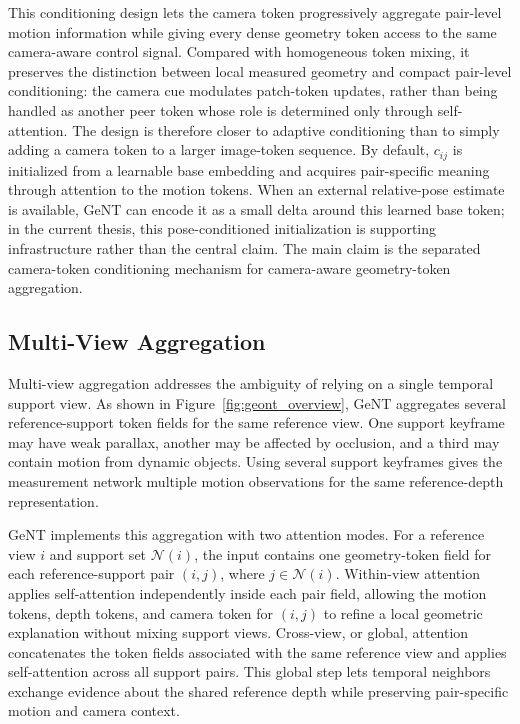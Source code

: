 This conditioning design lets the camera token progressively aggregate pair-level motion information while giving every dense geometry token access to the same camera-aware control signal.
Compared with homogeneous token mixing, it preserves the distinction between local measured geometry and compact pair-level conditioning: the camera cue modulates patch-token updates, rather than being handled as another peer token whose role is determined only through self-attention.
The design is therefore closer to adaptive conditioning than to simply adding a camera token to a larger image-token sequence.
By default, $c_{ij}$ is initialized from a learnable base embedding and acquires pair-specific meaning through attention to the motion tokens.
When an external relative-pose estimate is available, GeNT can encode it as a small delta around this learned base token; in the current thesis, this pose-conditioned initialization is supporting infrastructure rather than the central claim.
The main claim is the separated camera-token conditioning mechanism for camera-aware geometry-token aggregation.

\subsection{Multi-View Aggregation}
Multi-view aggregation addresses the ambiguity of relying on a single temporal support view.
As shown in Figure~\ref{fig:geont_overview}, GeNT aggregates several reference-support token fields for the same reference view.
One support keyframe may have weak parallax, another may be affected by occlusion, and a third may contain motion from dynamic objects.
Using several support keyframes gives the measurement network multiple motion observations for the same reference-depth representation.

GeNT implements this aggregation with two attention modes.
For a reference view $i$ and support set $\mathcal{N}(i)$, the input contains one geometry-token field for each reference-support pair $(i,j)$, where $j\in\mathcal{N}(i)$.
Within-view attention applies self-attention independently inside each pair field, allowing the motion tokens, depth tokens, and camera token for $(i,j)$ to refine a local geometric explanation without mixing support views.
Cross-view, or global, attention concatenates the token fields associated with the same reference view and applies self-attention across all support pairs.
This global step lets temporal neighbors exchange evidence about the shared reference depth while preserving pair-specific motion and camera context.

